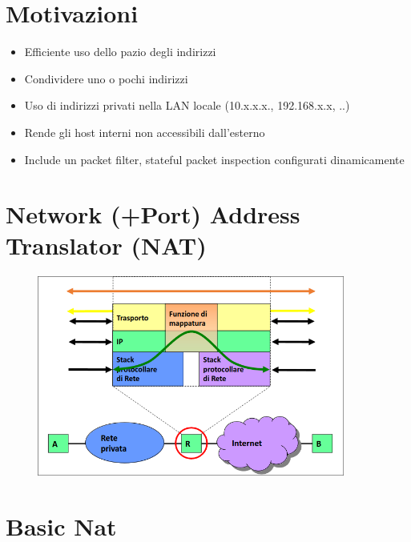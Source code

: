\documentclass{report}
\begin{document}
        \section{Motivazioni}
            \begin{itemize}
                \item Efficiente uso dello pazio degli indirizzi
                \item Condividere uno o pochi indirizzi
                \item Uso di indirizzi privati nella LAN locale (10.x.x.x., 192.168.x.x, ..)
                \item  Rende gli host interni non accessibili dall'esterno
                \item Include un packet filter, stateful packet inspection configurati dinamicamente
            \end{itemize}
        \section{Network (+Port) Address Translator (NAT)}
            \begin{figure}[H]
                \includegraphics[width=0.9\textwidth]{2/NAT2.png}
            \end{figure}
        \section{Basic Nat}
\end{document}
